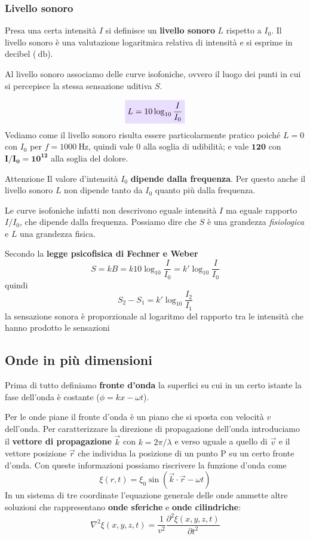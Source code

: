 \documentclass[x11names]{article}
\newcommand{\viola}[1]{\colorbox{yred}{$\displaystyle #1$}}
\begin{document}
	
	
	
	
	
	\subsubsection{Livello sonoro}
	Presa una certa intensità \(I\) si definisce un \textbf{livello sonoro} \(L\) rispetto a \(I_0\). Il livello sonoro è una valutazione logaritmica relativa di intensità e si esprime in decibel (\(\SI{}{\decibel}\)).
	
	Al livello sonoro associamo delle curve isofoniche, ovvero il luogo dei punti in cui si percepisce la stessa sensazione uditiva \(S\). 
	
	\begin{equation}\label{livello sonoro}
		\viola{L = 10\log_{10}{\frac{I}{I_0}}}
	\end{equation}
	Vediamo come il livello sonoro risulta essere particolarmente pratico poiché \(L = 0\) con \(I_0\) per \(f=1000\SI{}{\hertz}\), quindi vale 0 alla soglia di udibilità; e vale \(\boldsymbol{120}\) con \(\boldsymbol{I/I_0 = 10^{12}}\) alla soglia del dolore.
	
	\begin{es}{Attenzione}
		Il valore d'intensità \(I_0\) \textbf{dipende dalla frequenza}. Per questo anche il livello sonoro \(L\) non dipende tanto da \(I_0\) quanto più dalla frequenza. 
		
		Le curve isofoniche infatti non descrivono eguale intensità \(I\) ma eguale rapporto \(I/I_0\), che dipende dalla frequenza. Possiamo dire che \(S\) è una grandezza \textit{fisiologica} e \(L\) una grandezza fisica.
	\end{es}
	Secondo la \textbf{legge psicofisica di Fechner e Weber}
	\[ 
	S = kB = k10\log_10{\frac{I}{I_0}} = k'\log_10{\frac{I}{I_0}}
	\]
	quindi
	\begin{equation}
		S_2 - S_1 = k'\log_10{\frac{I_2}{I_1}}
	\end{equation}
	la sensazione sonora è proporzionale al logaritmo del rapporto tra le intensità che hanno prodotto le sensazioni
	
	
	\newpage
	\subsection{Onde in più dimensioni}	
	Prima di tutto definiamo \textbf{fronte d'onda} la superfici su cui in un certo istante la fase dell'onda è costante (\(\phi = kx -\omega t\)). 

	Per le onde piane il fronte d'onda è un piano che si sposta con velocità \(v\) dell'onda. Per caratterizzare la direzione di propagazione dell'onda introduciamo il \textbf{vettore di propagazione} \(\vec{k}\) con \(k = 2\pi/\lambda\) e verso uguale a quello di \(\vec{v}\) e il vettore posizione \(\vec{r}\) che individua la posizione di un punto P su un certo fronte d'onda. Con queste informazioni possiamo riscrivere la funzione d'onda come
	\[ 
	\xi(r,t) = \xi_0 \sin\left(\vec{k}\cdot \vec{r}- \omega t\right) 
	\]
	In un sistema di tre coordinate l'equazione generale delle onde ammette altre soluzioni che rappresentano \textbf{onde sferiche} e \textbf{onde cilindriche}: 
	\[ 
	\nabla^2\xi (x,y,z,t) = \frac{1}{v^2}\frac{\partial^2\xi (x,y,z,t)}{\partial t^2}
	\]
\end{document}
